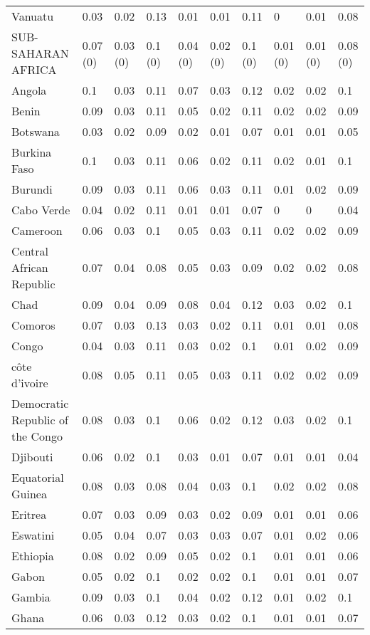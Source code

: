 \begin{longtable}[t]{llllllllll}
Vanuatu & 0.03 & 0.02 & 0.13 & 0.01 & 0.01 & 0.11 & 0 & 0.01 & 0.08\\
SUB-SAHARAN AFRICA & 0.07 (0) & 0.03 (0) & 0.1 (0) & 0.04 (0) & 0.02 (0) & 0.1 (0) & 0.01 (0) & 0.01 (0) & 0.08 (0)\\
Angola & 0.1 & 0.03 & 0.11 & 0.07 & 0.03 & 0.12 & 0.02 & 0.02 & 0.1\\
Benin & 0.09 & 0.03 & 0.11 & 0.05 & 0.02 & 0.11 & 0.02 & 0.02 & 0.09\\
Botswana & 0.03 & 0.02 & 0.09 & 0.02 & 0.01 & 0.07 & 0.01 & 0.01 & 0.05\\
Burkina Faso & 0.1 & 0.03 & 0.11 & 0.06 & 0.02 & 0.11 & 0.02 & 0.01 & 0.1\\
Burundi & 0.09 & 0.03 & 0.11 & 0.06 & 0.03 & 0.11 & 0.01 & 0.02 & 0.09\\
Cabo Verde & 0.04 & 0.02 & 0.11 & 0.01 & 0.01 & 0.07 & 0 & 0 & 0.04\\
Cameroon & 0.06 & 0.03 & 0.1 & 0.05 & 0.03 & 0.11 & 0.02 & 0.02 & 0.09\\
Central African Republic & 0.07 & 0.04 & 0.08 & 0.05 & 0.03 & 0.09 & 0.02 & 0.02 & 0.08\\
Chad & 0.09 & 0.04 & 0.09 & 0.08 & 0.04 & 0.12 & 0.03 & 0.02 & 0.1\\
Comoros & 0.07 & 0.03 & 0.13 & 0.03 & 0.02 & 0.11 & 0.01 & 0.01 & 0.08\\
Congo & 0.04 & 0.03 & 0.11 & 0.03 & 0.02 & 0.1 & 0.01 & 0.02 & 0.09\\
côte d'ivoire & 0.08 & 0.05 & 0.11 & 0.05 & 0.03 & 0.11 & 0.02 & 0.02 & 0.09\\
Democratic Republic of the Congo & 0.08 & 0.03 & 0.1 & 0.06 & 0.02 & 0.12 & 0.03 & 0.02 & 0.1\\
Djibouti & 0.06 & 0.02 & 0.1 & 0.03 & 0.01 & 0.07 & 0.01 & 0.01 & 0.04\\
Equatorial Guinea & 0.08 & 0.03 & 0.08 & 0.04 & 0.03 & 0.1 & 0.02 & 0.02 & 0.08\\
Eritrea & 0.07 & 0.03 & 0.09 & 0.03 & 0.02 & 0.09 & 0.01 & 0.01 & 0.06\\
Eswatini & 0.05 & 0.04 & 0.07 & 0.03 & 0.03 & 0.07 & 0.01 & 0.02 & 0.06\\
Ethiopia & 0.08 & 0.02 & 0.09 & 0.05 & 0.02 & 0.1 & 0.01 & 0.01 & 0.06\\
Gabon & 0.05 & 0.02 & 0.1 & 0.02 & 0.02 & 0.1 & 0.01 & 0.01 & 0.07\\
Gambia & 0.09 & 0.03 & 0.1 & 0.04 & 0.02 & 0.12 & 0.01 & 0.02 & 0.1\\
Ghana & 0.06 & 0.03 & 0.12 & 0.03 & 0.02 & 0.1 & 0.01 & 0.01 & 0.07\\

\end{longtable}
